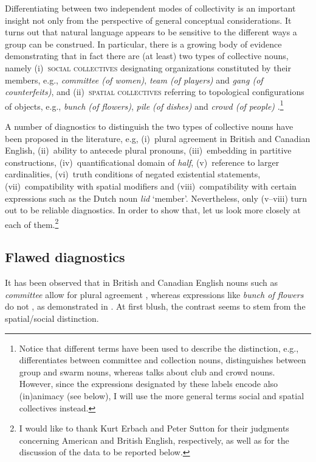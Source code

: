 \documentclass[output=paper]{langscibook}
\begin{document}
Differentiating between two independent modes of collectivity is an important insight not only from the perspective of general conceptual considerations. It turns out that natural language appears to be sensitive to the different ways a group can be construed. In particular, there is a growing body of evidence demonstrating that in fact there are (at least) two types of collective nouns, namely (i)~\textsc{social collectives} designating organizations constituted by their members, e.g., \textit{committee (of women)}, \textit{team (of players)} and \textit{gang (of counterfeits)}, and (ii)~\textsc{spatial collectives} referring to topological configurations of objects, e.g., \textit{bunch (of flowers)}, \textit{pile (of dishes)} and \textit{crowd (of people)} \citep{pearson2011new,de_vries2015shifting,henderson2017swarms,zwarts2020contiguity}.\footnote{Notice that different terms have been used to describe the distinction, e.g., \citeauthor{pearson2011new} differentiates between committee and collection nouns, \citeauthor{henderson2017swarms} distinguishes between group and swarm nouns, whereas \citeauthor{zwarts2020contiguity} talks about club and crowd nouns. However, since the expressions designated by these labels encode also (in)animacy (see below), I will use the more general terms social and spatial collectives instead.}

A number of diagnostics to distinguish the two types of collective nouns have been proposed in the literature, e.g, (i)~plural agreement in British and Canadian English, (ii)~ability to antecede plural pronouns, (iii)~embedding in partitive constructions, (iv)~quantificational domain of \textit{half}, (v)~reference to larger cardinalities, (vi)~truth conditions of negated existential statements, (vii)~compatibility with spatial modifiers and (viii)~compatibility with certain expressions such as the Dutch noun \textit{lid} `member'. Nevertheless, only (v--viii) turn out to be reliable diagnostics. In order to show that, let us look more closely at each of them.\footnote{I would like to thank Kurt Erbach and Peter Sutton for their judgments concerning American and British English, respectively, as well as for the discussion of the data to be reported below.}

\subsection{Flawed diagnostics}\label{wan:sec:flawed-diagnostics}

It has been observed that in British and Canadian English nouns such as \textit{committee} allow for plural agreement \citep{barker1992group}, whereas expressions like \textit{bunch of flowers} do not \citep{pearson2011new}, as demonstrated in . At first blush, the contrast seems to stem from the spatial/social distinction.
\end{document}
